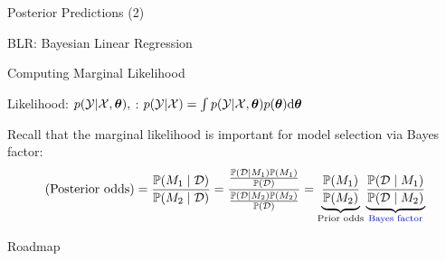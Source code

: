 \documentclass[handout,fleqn,aspectratio=169]{beamer}
\begin{document}
\begin{frame}{Posterior Predictions (2)}


\bci
\item BLR: Bayesian Linear Regression
\eci
\end{frame}


\begin{frame}{Computing Marginal Likelihood}

\plitemsep 0.07in

\bci 

\item Likelihood: $p({\cal Y} | {\cal X}, \bm{\theta}),$ : $p({\cal Y} | {\cal X}) = \int p({\cal Y} | {\cal X},\bm{\theta})p(\bm{\theta})\text{d}\bm{\theta}$

\item Recall that the marginal likelihood is important for model selection via Bayes factor: 
$$
\text{(Posterior odds)} = \frac{\mathbb{P}( M_1 \mid \mathcal D )}{\mathbb{P}( M_2 \mid \mathcal D )} = \frac
{
\frac{\mathbb{P}( \mathcal D \mid M_1 )\mathbb{P}( M_1 )}{\mathbb{P}( \mathcal D )}
}
{
\frac{\mathbb{P}( \mathcal D \mid M_2 )\mathbb{P}( M_2 )}{\mathbb{P}( \mathcal D )}
}
= \underbrace{\frac{\mathbb{P}( M_1 )}{\mathbb{P}( M_2 )}}_{\text{Prior odds}} 
\underbrace{\frac{\mathbb{P}( \mathcal D \mid M_1 )}{\mathbb{P}( \mathcal D \mid M_2 )}}_{{\color{blue} \text{Bayes factor}}}
$$

\item[] 
\eci
\end{frame}


\begin{frame}{Roadmap}

\plitemsep 0.1in

\bci 

\item  {}
\item  {} 
\item  {} 
\item  {} 
\item  {}

\eci
\end{frame}
\end{document}
